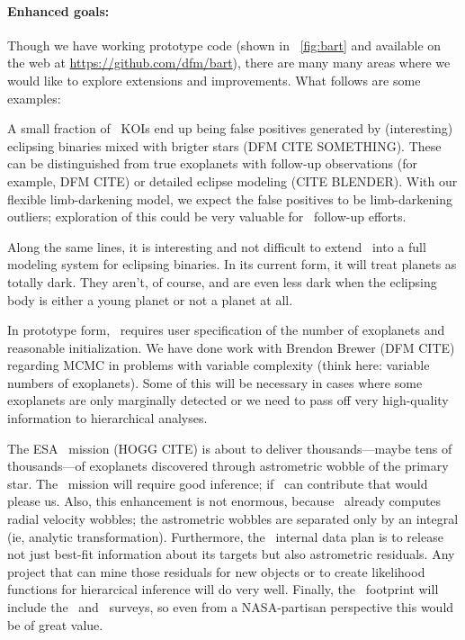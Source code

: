 \documentclass[letterpaper,12pt,preprint]{hack_aastex}
\newcommand{\Bart}{\package{Bart}}
\begin{document}
\paragraph{Enhanced goals:}
Though we have working prototype code (shown in
\figurename~\ref{fig:bart} and available on the web at
\url{https://github.com/dfm/bart}), there are many many areas where we
would like to explore extensions and improvements.  What follows are
some examples:

A small fraction of \Kepler\ KOIs end up being false positives
generated by (interesting) eclipsing binaries mixed with brigter stars
(DFM CITE SOMETHING).  These can be distinguished from true exoplanets
with follow-up observations (for example, DFM CITE) or detailed
eclipse modeling (CITE BLENDER).  With our flexible limb-darkening
model, we expect the false positives to be limb-darkening outliers;
exploration of this could be very valuable for \Kepler\ follow-up
efforts.

Along the same lines, it is interesting and not difficult to extend
\Bart\ into a full modeling system for eclipsing binaries.  In its
current form, it will treat planets as totally dark.  They aren't, of
course, and are even less dark when the eclipsing body is either a
young planet or not a planet at all.

In prototype form, \Bart\ requires user specification of the number of
exoplanets and reasonable initialization.  We have done work with
Brendon Brewer (DFM CITE) regarding MCMC in problems with variable
complexity (think here: variable numbers of exoplanets).  Some of this
will be necessary in cases where some exoplanets are only marginally
detected or we need to pass off very high-quality information to
hierarchical analyses.

The ESA \Gaia\ mission (HOGG CITE) is about to deliver
thousands---maybe tens of thousands---of exoplanets discovered through
astrometric wobble of the primary star.  The \Gaia\ mission will
require good inference; if \Bart\ can contribute that would please us.
Also, this enhancement is not enormous, because \Bart\ already
computes radial velocity wobbles; the astrometric wobbles are
separated only by an integral (ie, analytic transformation).
Furthermore, the \Gaia\ internal data plan is to release not just
best-fit information about its targets but also astrometric residuals.
Any project that can mine those residuals for new objects or to create
likelihood functions for hierarcical inference will do very well.
Finally, the \Gaia\ footprint will include the \Kepler\ and
\TESS\ surveys, so even from a NASA-partisan perspective this would be
of great value.
\end{document}
